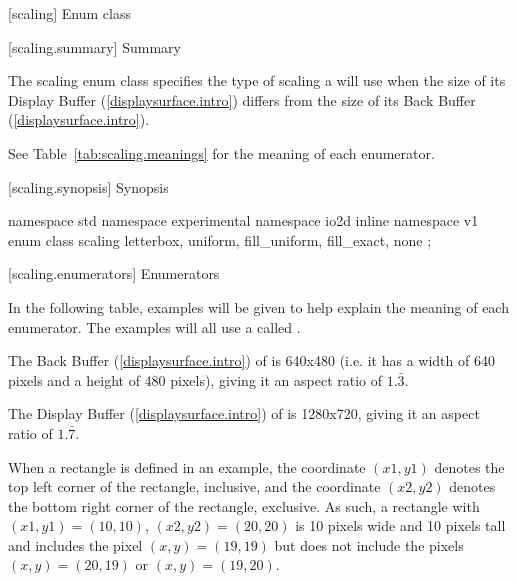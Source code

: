  [scaling] {Enum class }

 [scaling.summary] { Summary}

\pnum
The scaling enum class specifies the type of scaling a  
will use when the size of its Display Buffer (\ref{displaysurface.intro}) differs from the size of its Back Buffer (\ref{displaysurface.intro}).

\pnum
See Table~\ref{tab:scaling.meanings} for the meaning of each  enumerator.

 [scaling.synopsis] { Synopsis}

\begin{codeblock}
namespace std { namespace experimental { namespace io2d { inline namespace v1 {
  enum class scaling {
    letterbox,
    uniform,
    fill_uniform,
    fill_exact,
    none
  };
} } } }
\end{codeblock}

 [scaling.enumerators] { Enumerators}

\pnum
\enternote
In the following table, examples will be given to help explain the meaning of each enumerator. The examples will all use a  called .

The Back Buffer (\ref{displaysurface.intro}) of  is 640x480 (i.e. it has a width of 640 pixels and a height of 480 pixels), giving it an aspect ratio of $1.\bar{3}$.

The Display Buffer (\ref{displaysurface.intro}) of  is 1280x720, giving it an aspect ratio of $1.\bar{7}$.

When a rectangle is defined in an example, the coordinate $(x1,y1)$ denotes the top left corner of the rectangle, inclusive, and the coordinate $(x2,y2)$ denotes the bottom right corner of the rectangle, exclusive. As such, a rectangle with $(x1,y1) = (10,10)$, $(x2,y2) = (20, 20)$ is 10 pixels wide and 10 pixels tall and includes the pixel $(x,y) = (19,19)$ but does not include the pixels $(x,y) = (20,19)$ or $(x,y) = (19,20)$.
\exitnote


